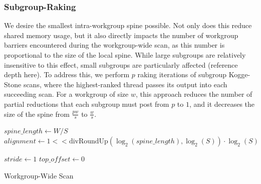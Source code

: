 \documentclass[sigconf]{acmart}
\begin{document}
\subsubsection{Subgroup-Raking}
We desire the smallest intra-workgroup spine possible. Not only does this reduce shared memory usage, but it also directly impacts the number of workgroup barriers encountered during the workgroup-wide scan, as this number is proportional to the size of the local spine. While large subgroups are relatively insensitive to this effect, small subgroups are particularly affected (reference depth here). To address this, we perform $p$ raking iterations of subgroup Kogge-Stone scans, where the highest-ranked thread passes its output into each succeeding scan. For a workgroup of size $w$, this approach reduces the number of partial reductions that each subgroup must post from $p$ to $1$, and it decreases the size of the spine from $\frac{pw}{s}$ to $\frac{w}{s}$.
\begin{algorithm}[htbp]
  \small
  \SetAlgoLined
  
  $spine\_length \gets W / S$\;
  $alignment \gets 1 << \text{divRoundUp}(\log_2(spine\_length), \log_2(S)) \cdot \log_2(S)$\;

  $stride \gets 1$\;
  $top\_offset \gets 0$\;

  \;
  \caption{Workgroup-Wide Scan}
  \label{alg:example}
\end{algorithm}
\end{document}
